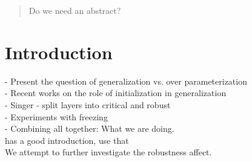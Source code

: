 \documentclass{article}
\begin{document}

\begin{abstract}
Do we need an abstract?
\end{abstract}
\section{Introduction}
 - Present the question of generalization vs. over parameterization\\
 - Recent works on the role of initialization in generalization\\
 - Singer - split layers into critical and robust\\
 - Experiments with freezing\\
 - Combining all together: What we are doing.\\
 \cite{learningNothing} has a good introduction, use that\\

We attempt to further investigate the robustness affect.
\end{document}
